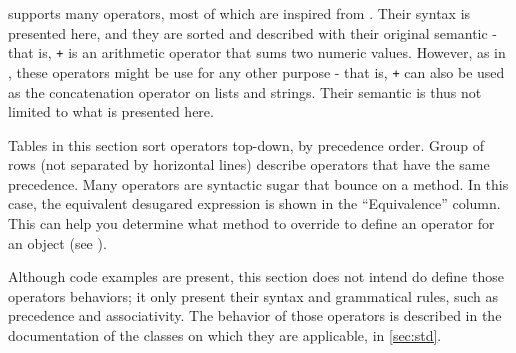 \documentclass[openright,twoside,12pt]{report}
\begin{document}
\us supports many operators, most of which are inspired from
\Cxx. Their syntax is presented here, and they are sorted and
described with their original semantic - that is, \lstinline|+| is an
arithmetic operator that sums two numeric values. However, as in \Cxx,
these operators might be use for any other purpose - that is,
\lstinline|+| can also be used as the concatenation operator on lists
and strings. Their semantic is thus not limited to what is presented
here.

Tables in this section sort operators top-down, by precedence order.
Group of rows (not separated by horizontal lines) describe operators
that have the same precedence. Many operators are syntactic sugar that
bounce on a method. In this case, the equivalent desugared expression
is shown in the ``Equivalence'' column. This can help you determine
what method to override to define an operator for an object (see
).

Although code examples are present, this section does not intend do
define those operators behaviors; it only present their syntax and
grammatical rules, such as precedence and associativity. The behavior
of those operators is described in the documentation of the classes on
which they are applicable, in \autoref{sec:std}.

\newcommand{\operatorhead}{Operator & Use & Associativity & Original semantic
  & Equivalence\\}


\newcommand{\operator}[6][ ]{\lstinline@#2@&\lstinline@#3@&#4&#5&\lstinline@#6@#1\\}
\newcommand{\boperator}[3]{\operator{#1}{a #1 b}{#2}{#3}{a.'#1'(b)}}
\newcommand{\poperator}[3]{\operator{#1}{#1a}{#2}{#3}{a.'#1'()}}

\newcommand{\operatordot}    {\operator  {.}    {a.b}              {-}     {Message sending}          {Not redefinable}       }
\newcommand{\operatordota}   {\operator  {.}    {a.b(args)}        {-}     {Message sending}          {Not redefinable}       }
\newcommand{\operatorsub}    {\operator  {[]}   {a[args]}          {-}     {Subscript}                {a.'[]'(args)}          }
\newcommand{\operatorsubass} {\operator  {[] =} {a[args] = v}      {-}     {Subscript assignment}     {a.'[]='(args, v)}      }
\newcommand{\operatorass}[2][ ]    {\operator[#1]
                                         {=}    {a = b}            {Right} {Assignment}               {updateSlot("a", b)}    }

\newcommand{\operatoriass}[1]{\operator  {#1=}  {a #1= b}          {Right} {In place assignment}      {a = a #1 b}            }
\newcommand{\operatorsiass}  {
    \operatoriass{+}
    \operatoriass{-}
    \operatoriass{*}
    \operatoriass{/}
    \operatoriass{\%}
    \operatoriass{\^}
    \operatoriass{\~}
}
\newcommand{\operatorinc}    {\operator  {++}   {a++}              {-}     {Incrementation}           {(a = a + 1) - 1}       }
\newcommand{\operatordec}    {\operator  {--}   {a--}              {-}     {Incrementation}           {(a = a - 1) + 1}       }
\end{document}
